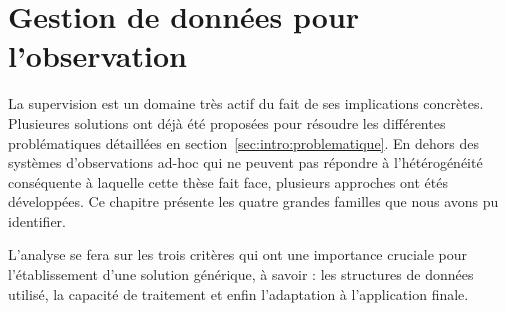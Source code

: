 \chapter{Gestion de données pour l'observation}
\minitoc

La supervision est un domaine très actif du fait de ses implications concrètes. Plusieures solutions ont déjà été proposées pour résoudre les différentes problématiques détaillées en section~\ref{sec:intro:problematique}. En dehors des systèmes d'observations ad-hoc qui ne peuvent pas répondre à l'hétérogénéité conséquente à laquelle cette thèse fait face, plusieurs approches ont étés développées. Ce chapitre présente les quatre grandes familles que nous avons pu identifier.

L'analyse se fera sur les trois critères qui ont une importance cruciale pour l'établissement d'une solution générique, à savoir : les structures de données utilisé, la capacité de traitement et enfin l'adaptation à l'application finale.








